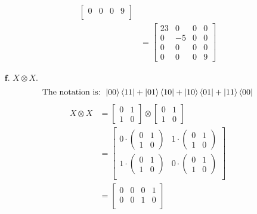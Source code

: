 \documentclass[11pt]{article}
\begin{document}
\begin{enumerate}
\begin{align*}
\begin{bmatrix}
            0 & 0 & 0 & 9 \\
        \end{bmatrix} \\
        &= \begin{bmatrix}
            23 & 0 & 0 & 0 \\ 
            0 & -5 & 0 & 0 \\
            0 & 0 & 0 & 0 \\
            0 & 0 & 0 & 9
        \end{bmatrix}
    \end{align*}
\newpage
\item[$\textbf{f.}$] $X \otimes X$.
    $$\text{The notation is: } \ket{00}\bra{11} + \ket{01}\bra{10} + \ket{10}\bra{01}
    + \ket{11}\bra{00}$$
    \begin{align*}
        X \otimes X &= 
                    \begin{bmatrix}0 & 1 \\ 1 & 0 \end{bmatrix}
                        \otimes
                    \begin{bmatrix}0 & 1 \\ 1 & 0 \end{bmatrix} \\
                    &= 
                    \begin{bmatrix}
                        0 \cdot \begin{pmatrix}0 & 1 \\ 1 & 0 \end{pmatrix} 
                    &   1 \cdot \begin{pmatrix}0 & 1 \\ 1 & 0 \end{pmatrix}  \\
                        1 \cdot \begin{pmatrix}0 & 1 \\ 1 & 0 \end{pmatrix} 
                    &   0 \cdot \begin{pmatrix}0 & 1 \\ 1 & 0 \end{pmatrix}  \\
                    \end{bmatrix} \\
                    &= \begin{bmatrix}
                    0 & 0 & 0 & 1\\
                    0 & 0 & 1 & 0\\

\end{bmatrix}
\end{align*}
\end{enumerate}
\end{document}
